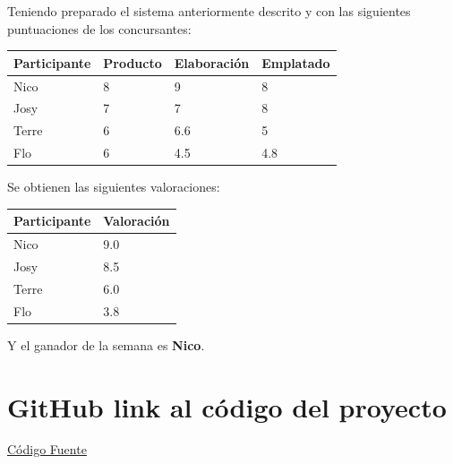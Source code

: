 \documentclass[12pt]{article}
\begin{document}
Teniendo preparado el sistema anteriormente descrito y con las siguientes puntuaciones de los concursantes:
\newline
\newline
\newline
\begin{table}
	\begin{center}
		\begin{tabular}{| l | l | l | l |}
			\hline
			Participante & Producto & Elaboraci\'on & Emplatado\\
			\hline
			Nico & 8 & 9 & 8\\
			\hline
			Josy & 7 & 7 & 8\\
			\hline
			Terre & 6 & 6.6 & 5\\
			\hline
			Flo & 6 & 4.5 & 4.8\\
			\hline
		\end{tabular}
		
	\end{center}
	
\end{table}
\newline
Se obtienen las siguientes valoraciones:
\newline
\begin{table}[H]
	\begin{center}
		\begin{tabular}{| l | l |}
			\hline
			Participante & Valoraci\'on\\
			\hline
			Nico & 9.0\\
			\hline
			Josy & 8.5 \\ 
			\hline
			Terre & 6.0 \\
			\hline
			Flo & 3.8 \\  
			\hline
		\end{tabular}
		
	\end{center}
	
\end{table}

Y el ganador de la semana es \textbf{Nico}.

\section{GitHub link al c\'odigo del proyecto}
\href{https://github.com/stdevMauricio1802/fuzzy-inference-system.git}{C\'odigo Fuente}
\end{document}
